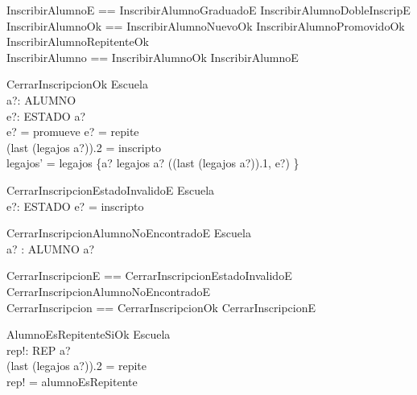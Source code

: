 \documentclass{article}
\begin{document}
  \begin{zed}
    InscribirAlumnoE == InscribirAlumnoGraduadoE \lor InscribirAlumnoDobleInscripE \\
    InscribirAlumnoOk == InscribirAlumnoNuevoOk \lor InscribirAlumnoPromovidoOk \\ 
                         \lor InscribirAlumnoRepitenteOk \\
    InscribirAlumno == InscribirAlumnoOk \lor InscribirAlumnoE
  \end{zed}

  \begin{schema}{CerrarInscripcionOk}
    \Delta Escuela \\
    a?: ALUMNO \\
    e?: ESTADO
    \where
    a? \in {} \\
    e? = promueve \lor e? = repite \\
    (last \; (legajos \; a?)).2 = inscripto \\
    legajos' = legajos \oplus \{a? \mapsto legajos \; a? \cat \langle ((last \; (legajos \; a?)).1, e?) \rangle\}
  \end{schema}

  \begin{schema}{CerrarInscripcionEstadoInvalidoE}
    \Xi Escuela \\
    e?: ESTADO
    \where
    e? = inscripto
  \end{schema}

  \begin{schema}{CerrarInscripcionAlumnoNoEncontradoE}
    \Xi Escuela \\
    a? : ALUMNO
    \where
    a? \notin {}
  \end{schema}

  \begin{zed}
    CerrarInscripcionE == CerrarInscripcionEstadoInvalidoE \lor CerrarInscripcionAlumnoNoEncontradoE \\
    CerrarInscripcion == CerrarInscripcionOk \lor CerrarInscripcionE
  \end{zed}

  \begin{schema}{AlumnoEsRepitenteSiOk}
    \Xi Escuela \\
    rep!: REP
    \where
    a? \in {} \\
    (last \; (legajos \; a?)).2 = repite \\
    rep! = alumnoEsRepitente
  \end{schema}
\end{document}
